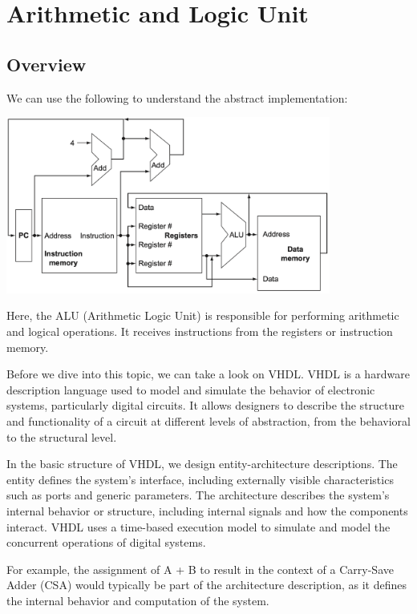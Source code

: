 \chapter{Arithmetic and Logic Unit}

\section{Overview}
We can use the following to understand the abstract implementation:

\begin{center}
  \includegraphics[width=0.8\textwidth]{Figure/AIV.png}
\end{center}

Here, the ALU (Arithmetic Logic Unit) is responsible for performing arithmetic and logical operations. It receives instructions from the registers or instruction memory.

Before we dive into this topic, we can take a look on VHDL. VHDL is a hardware description language used to model and simulate the behavior of electronic systems, particularly digital circuits. It allows designers to describe the structure and functionality of a circuit at different levels of abstraction, from the behavioral to the structural level. 

In the basic structure of VHDL, we design entity-architecture descriptions. The entity defines the system's interface, including externally visible characteristics such as ports and generic parameters. The architecture describes the system's internal behavior or structure, including internal signals and how the components interact. VHDL uses a time-based execution model to simulate and model the concurrent operations of digital systems.

For example, the assignment of A + B to result in the context of a Carry-Save Adder (CSA) would typically be part of the architecture description, as it defines the internal behavior and computation of the system.


